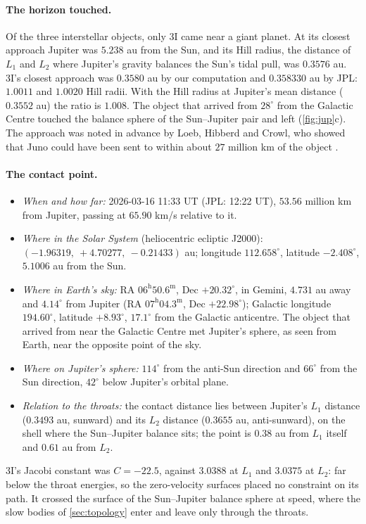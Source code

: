 \documentclass[11pt]{article}
\theoremstyle{definition}\newtheorem{definition}[theorem]{Definition}
\theoremstyle{remark}\newtheorem{remark}[theorem]{Remark}
\begin{document}
\paragraph{The horizon touched.} Of the three interstellar objects, only 3I came near a giant planet. At its closest approach Jupiter was $5.238$ au from the Sun, and its Hill radius, the distance of $L_1$ and $L_2$ where Jupiter's gravity balances the Sun's tidal pull, was $0.3576$ au. 3I's closest approach was $0.3580$ au by our computation and $0.358330$ au by JPL: $1.0011$ and $1.0020$ Hill radii. With the Hill radius at Jupiter's mean distance ($0.3552$ au) the ratio is $1.008$. The object that arrived from $28^\circ$ from the Galactic Centre touched the balance sphere of the Sun--Jupiter pair and left (\cref{fig:jup}c). The approach was noted in advance by Loeb, Hibberd and Crowl, who showed that Juno could have been sent to within about $27$ million km of the object \cite{LoebJuno}.

\paragraph{The contact point.}
\begin{itemize}
\item \emph{When and how far:} 2026-03-16 11:33 UT (JPL: 12:22 UT), $53.56$ million km from Jupiter, passing at $65.90$ km/s relative to it.
\item \emph{Where in the Solar System} (heliocentric ecliptic J2000): $(-1.96319,\ +4.70277,\ -0.21433)$ au; longitude $112.658^\circ$, latitude $-2.408^\circ$, $5.1006$ au from the Sun.
\item \emph{Where in Earth's sky:} RA $06^\mathrm{h}50.6^\mathrm{m}$, Dec $+20.32^\circ$, in Gemini, $4.731$ au away and $4.14^\circ$ from Jupiter (RA $07^\mathrm{h}04.3^\mathrm{m}$, Dec $+22.98^\circ$); Galactic longitude $194.60^\circ$, latitude $+8.93^\circ$, $17.1^\circ$ from the Galactic anticentre. The object that arrived from near the Galactic Centre met Jupiter's sphere, as seen from Earth, near the opposite point of the sky.
\item \emph{Where on Jupiter's sphere:} $114^\circ$ from the anti-Sun direction and $66^\circ$ from the Sun direction, $42^\circ$ below Jupiter's orbital plane.
\item \emph{Relation to the throats:} the contact distance lies between Jupiter's $L_1$ distance ($0.3493$ au, sunward) and its $L_2$ distance ($0.3655$ au, anti-sunward), on the shell where the Sun--Jupiter balance sits; the point is $0.38$ au from $L_1$ itself and $0.61$ au from $L_2$.
\end{itemize}
3I's Jacobi constant was $C=-22.5$, against $3.0388$ at $L_1$ and $3.0375$ at $L_2$: far below the throat energies, so the zero-velocity surfaces placed no constraint on its path. It crossed the surface of the Sun--Jupiter balance sphere at speed, where the slow bodies of \cref{sec:topology} enter and leave only through the throats.
\end{document}

